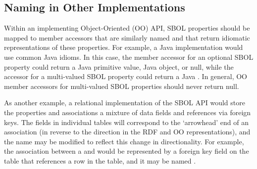 \subsection{Naming in Other Implementations}

Within an implementing Object-Oriented (OO) API, SBOL properties should be mapped to member accessors that are similarly named and that return idiomatic representations of these properties. For example, a Java implementation would use common Java idioms. In this case, the member accessor for an optional SBOL property could return a Java primitive value, Java object, or null, while the accessor for a multi-valued SBOL property could return a Java . In general, OO member accessors for multi-valued SBOL properties should never return null.

As another example, a relational implementation of the SBOL API would store the properties and associations a mixture of data fields and references via foreign keys. The fields in individual tables will correspond to the `arrowhead' end of an association (in reverse to the direction in the RDF and OO representations), and the name may be modified to reflect this change in directionality. For example, the  association between a  and  would be represented by a foreign key field on the  table that references a row in the  table, and it may be named .
